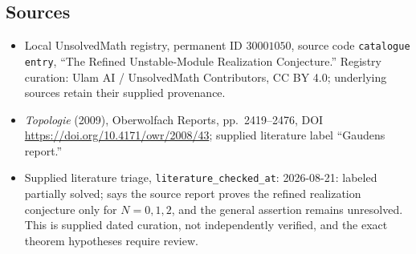 \documentclass[11pt]{article}
\begin{document}
\subsection{Sources}
\begin{itemize}
\item Local UnsolvedMath registry, permanent ID \(30001050\), source code \texttt{catalogue entry}, ``The Refined Unstable-Module Realization Conjecture.'' Registry curation: Ulam AI / UnsolvedMath Contributors, CC BY 4.0; underlying sources retain their supplied provenance.
\item \emph{Topologie} (2009), Oberwolfach Reports, pp.\ 2419--2476, DOI \url{https://doi.org/10.4171/owr/2008/43}; supplied literature label ``Gaudens report.''
\item Supplied literature triage, \texttt{literature\_checked\_at}: 2026-08-21: labeled partially solved; says the source report proves the refined realization conjecture only for \(N=0,1,2\), and the general assertion remains unresolved. This is supplied dated curation, not independently verified, and the exact theorem hypotheses require review.
\end{itemize}
\end{document}
